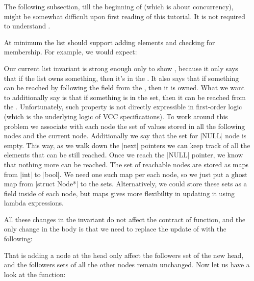\begin{note}
The following subsection, till the beginning of  (which is
about concurrency), might be somewhat difficult upon first reading of this
tutorial.
It is not required to understand .
\end{note}

At minimum the list should support adding elements and checking
for membership. For example, we would expect:


\noindent
Our current list invariant is strong enough only to show
, because it only says
that if the list owns something, then it's in the .
It also says that if something can be reached by following
the  field from the , then it is owned.
What we want to additionally say is that if something is in the 
set, then it can be reached from the .
Unfortunately, such property is not directly expressible in first-order
logic (which is the underlying logic of VCC specifications).
To work around this problem we associate with each node
the set of values stored in all the following nodes and
the current node.
Additionally we say that the set for \vcc|NULL| node is empty.
This way, as we walk down the \vcc|next| pointers we can keep
track of all the elements that can be still reached.
Once we reach the \vcc|NULL| pointer, we know that nothing
more can be reached.
The set of reachable nodes are stored as maps from
\vcc|int| to \vcc|bool|.
We need one such map per each node, so we just
put a ghost map from \vcc|struct Node*| to the sets.
Alternatively, we could store these sets as a field inside of each node,
but maps gives more flexibility in updating it using lambda expressions.


\noindent
All these changes in the invariant do not affect
the contract of  function, and the only change in the body
is that we need to replace the update of  with the following:


\noindent
That is adding a node at the head only affect the followers set of the new head,
and the followers sets of all the other nodes remain unchanged.
Now let us have a look at the  function:


